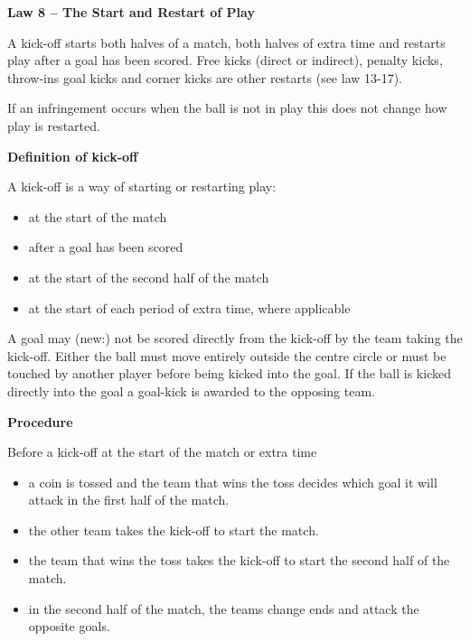 \clearpage
\sffamily
{\bfseries\color[rgb]{0.4,0.4,0.4}
Law 8 -- The Start and Restart of Play}
{}

\bigskip

A kick-off starts both halves of a match, both halves of extra time and restarts
play after a goal has been scored.
Free kicks (direct or indirect), penalty kicks, throw-ins goal kicks and corner
kicks are other restarts (see law 13-17).

\bigskip

If an infringement occurs when the ball is not in play this does not change how
play is restarted.

\bigskip

{\bfseries Definition of kick-off}

\headlinebox

A kick-off is a way of starting or restarting play:

\begin{itemize}
\item at the start of the match 
\item after a goal has been scored 
\item at the start of the second half of the match 
\item at the start of each period of extra time, where applicable
\end{itemize}

A goal may (new:) not be scored directly from the kick-off by the team taking the kick-off.
Either the ball must move entirely outside the centre circle or must be touched
by another player before being kicked into the goal.
If the ball is kicked directly into the goal a goal-kick
is awarded to the opposing team.

\bigskip

{\bfseries Procedure }

\headlinebox

Before a kick-off at the start of the match or extra time 

\begin{itemize}
\item a coin is tossed and the team that wins the toss decides which goal it will attack in the first half of the match.
\item the other team takes the kick-off to start the match. 
\item the team that wins the toss takes the kick-off to start the second half of the match.
\item in the second half of the match, the teams change ends and attack the opposite goals. 
\end{itemize}

